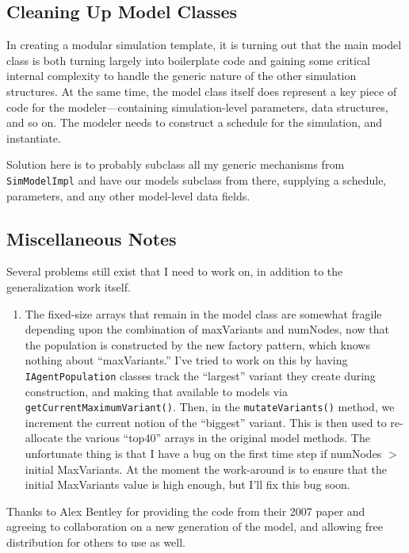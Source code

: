 \documentclass{kluwer-mem-copyright}
\begin{document}
\begin{article}
\subsection{Cleaning Up Model Classes}
In creating a modular simulation template, it is turning out that the main model
class is both turning largely into boilerplate code and gaining some critical
internal complexity to handle the generic nature of the other simulation
structures.  At the same time, the model class itself does represent a key piece
of code for the modeler---containing simulation-level parameters, data
structures, and so on.  The modeler needs to construct a schedule for the
simulation, and instantiate.  

Solution here is to probably subclass all my generic mechanisms from
\texttt{SimModelImpl} and have our models subclass from there, supplying a
schedule, parameters, and any other model-level data fields.

\subsection{Miscellaneous Notes}
Several problems still exist that I need to work on, in addition to the
generalization work itself.  
\begin{enumerate}
  \item The fixed-size arrays that remain in the model class are somewhat
  fragile depending upon the combination of maxVariants and numNodes, now that
  the population is constructed by the new factory pattern, which knows nothing
  about ``maxVariants.''  I've tried to work on this by having
  \texttt{IAgentPopulation} classes track the ``largest'' variant they create
  during construction, and making that available to models via
  \texttt{getCurrentMaximumVariant()}.  Then, in the \texttt{mutateVariants()} 
  method, we increment the current notion of the ``biggest'' variant.  This is
  then used to re-allocate the various ``top40'' arrays in the original model
  methods.  The unfortunate thing is that I have a bug on the first time step if
  numNodes \( > \) initial MaxVariants.  At the moment the work-around is to
  ensure
  that the initial MaxVariants value is high enough, but I'll fix this bug soon.
\end{enumerate}

\acknowledgements
Thanks to Alex Bentley for providing the code from their 2007 paper and agreeing
to collaboration on a new generation of the model, and allowing free
distribution for others to use as well.  
\end{article}
\end{document}
